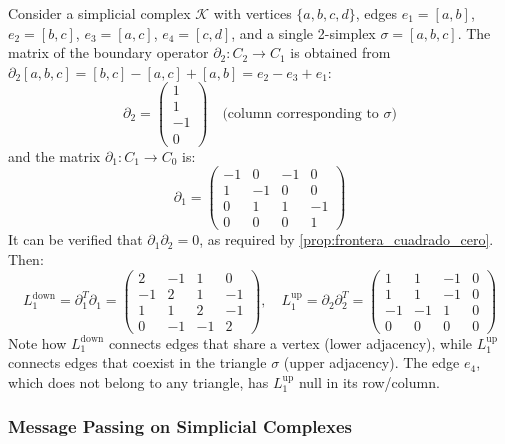 \begin{example}\label{ex:hodge_laplacian_triangular}
	Consider a simplicial complex $\mathcal{K}$ with vertices $\{a, b, c, d\}$, edges $e_1 = [a,b]$, $e_2 = [b,c]$, $e_3 = [a,c]$, $e_4 = [c,d]$, and a single 2-simplex $\sigma = [a,b,c]$. The matrix of the boundary operator $\partial_2: C_2 \to C_1$ is obtained from $\partial_2[a,b,c] = [b,c] - [a,c] + [a,b] = e_2 - e_3 + e_1$:
	\[
		\partial_2 = \begin{pmatrix} 1 \\ 1 \\ -1 \\ 0 \end{pmatrix} \quad \text{(column corresponding to $\sigma$)}
	\]
	and the matrix $\partial_1: C_1 \to C_0$ is:
	\[
		\partial_1 = \begin{pmatrix} -1 & 0 & -1 & 0 \\ 1 & -1 & 0 & 0 \\ 0 & 1 & 1 & -1 \\ 0 & 0 & 0 & 1 \end{pmatrix}
	\]
	It can be verified that $\partial_1 \partial_2 = 0$, as required by \autoref{prop:frontera_cuadrado_cero}. Then:
	\[
		L_1^{\mathrm{down}} = \partial_1^T \partial_1 = \begin{pmatrix} 2 & -1 & 1 & 0 \\ -1 & 2 & 1 & -1 \\ 1 & 1 & 2 & -1 \\ 0 & -1 & -1 & 2 \end{pmatrix}, \quad
		L_1^{\mathrm{up}} = \partial_2 \partial_2^T = \begin{pmatrix} 1 & 1 & -1 & 0 \\ 1 & 1 & -1 & 0 \\ -1 & -1 & 1 & 0 \\ 0 & 0 & 0 & 0 \end{pmatrix}
	\]
	Note how $L_1^{\mathrm{down}}$ connects edges that share a vertex (lower adjacency), while $L_1^{\mathrm{up}}$ connects edges that coexist in the triangle $\sigma$ (upper adjacency). The edge $e_4$, which does not belong to any triangle, has $L_1^{\mathrm{up}}$ null in its row/column.
\end{example}

\subsubsection{Message Passing on Simplicial Complexes}\label{subsubsec:message_passing_simplicial_gdl}


